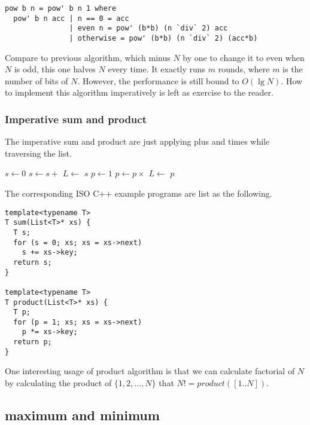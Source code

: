 \documentclass{article}
\begin{document}
\lstset{language=Haskell}
\begin{lstlisting}
pow b n = pow' b n 1 where
  pow' b n acc | n == 0 = acc
               | even n = pow' (b*b) (n `div` 2) acc
               | otherwise = pow' (b*b) (n `div` 2) (acc*b)
\end{lstlisting}

Compare to previous algorithm, which minus $N$ by one to change it to even when $N$ is odd, this one halves $N$ every
time. It exactly runs $m$ rounds, where $m$ is the number of bits of $N$. However, the performance is still bound to 
$O(\lg N)$. How to implement this algorithm imperatively is left as exercise to the reader.

\subsubsection{Imperative sum and product}
The imperative sum and product are just applying plus and times while traversing the list.

\begin{algorithmic}
  \State $s \gets 0$
    \State $s \gets s +$ 
    \State $L \gets$ 
  \EndWhile
  \State \Return $s$
\EndFunction
\Statex
{}
  \State $p \gets 1$
    \State $p \gets p \times $ 
    \State $L \gets$ 
  \EndWhile
  \State \Return $p$
\EndFunction
\end{algorithmic}

The corresponding ISO C++ example programs are list as the following.

\lstset{language=C++}
\begin{lstlisting}
template<typename T>
T sum(List<T>* xs) {
  T s;
  for (s = 0; xs; xs = xs->next)
    s += xs->key;
  return s;
}

template<typename T>
T product(List<T>* xs) {
  T p;
  for (p = 1; xs; xs = xs->next)
    p *= xs->key;
  return p;
}
\end{lstlisting}

One interesting usage of product algorithm is that we can calculate factorial of $N$ by calculating the
product of $\{1, 2, ..., N\}$ that $N! = product([1..N])$.

\subsection{maximum and minimum}
\end{document}
